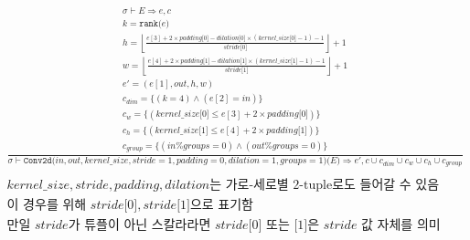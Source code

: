 \documentclass{article}
\newcommand{\x}{\times}
\newcommand{\rem}{\mtt{\%}}
\newcommand{\Rar}{\Rightarrow}
\newcommand{\mtt}[1]{\mathtt{#1}}
\newcommand{\op}[2]{\mtt{#1(}#2\mtt{)}}
\newcommand{\module}[3]{\mtt{#1(}#2\mtt{)(}#3\mtt{)}}
\newcommand{\ind}[1]{\mtt{[}#1\mtt{]}}
\begin{document}
\begin{align*}
  \frac
  {
    \begin{array}{l}
      \sigma \vdash E \Rar e, c \\
      k = \op{rank}{e} \\
      h = \left\lfloor \frac{e[3] + 2 \x padding \ind{0} - dilation \ind{0}
        \x (kernel\_size \ind{0} - 1) - 1}{stride \ind{0}} \right\rfloor + 1 \\
      w = \left\lfloor \frac{e[4] + 2 \x padding \ind{1} - dilation \ind{1}
        \x (kernel\_size \ind{1} - 1) - 1}{stride \ind{1}} \right\rfloor + 1 \\
      e' = (e[1], out, h, w) \\
      c_{dim} = \{ (k = 4) \land (e[2] = in) \} \\
      c_w = \{ (kernel\_size\ind{0} \leq e[3] + 2 \x padding \ind{0}) \} \\
      c_h = \{ (kernel\_size\ind{1} \leq e[4] + 2 \x padding \ind{1}) \} \\
      c_{group} = \{ (in \rem groups = 0) \land (out \rem groups = 0) \}
    \end{array}
  }
  {
    \sigma \vdash \module{Conv2d}{in, out, kernel\_size, stride=1, padding=0,
      dilation=1, groups=1}{E} \Rar e', c \cup c_{dim} \cup c_w \cup c_h \cup
      c_{group}
  } \\
  \\
  \text{$kernel\_size, stride, padding, dilation$는 가로-세로별 2-tuple로도 들어갈
  수 있음} \\
  \text{이 경우를 위해 $stride\ind{0}, stride\ind{1}$으로 표기함} \\
  \text{만일 $stride$가 튜플이 아닌 스칼라라면 $stride\ind{0}$ 또는 $\ind{1}$은
    $stride$ 값 자체를 의미}
\end{align*}%
\end{document}
